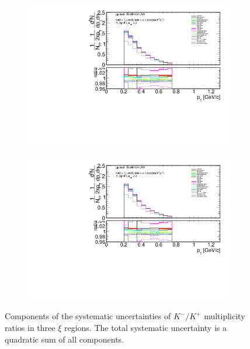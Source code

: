 \begin{figure}[h!]
\begin{subfigure}{.49\textwidth}
		\end{subfigure}
		\begin{subfigure}{.49\textwidth}
			\includegraphics[width=\textwidth,page=23]{chapters/chrgSTAR/img/syst/outPID_SDT.pdf}
		\end{subfigure}
		\begin{subfigure}{.49\textwidth}
			\includegraphics[width=\textwidth,page=24]{chapters/chrgSTAR/img/syst/outPID_SDT.pdf}
		\end{subfigure}
		\begin{minipage}{.49\textwidth}
			\caption[Components of the systematic uncertainties of $K^-/K^+$ multiplicity ratios  in three $\xi$ regions]{Components of the systematic uncertainties of $K^-/K^+$ multiplicity ratios  in three $\xi$ regions. The total  systematic uncertainty is a quadratic sum of all  components.}
			\label{fig:results_star_syst_K}
		\end{minipage}
\end{figure}

